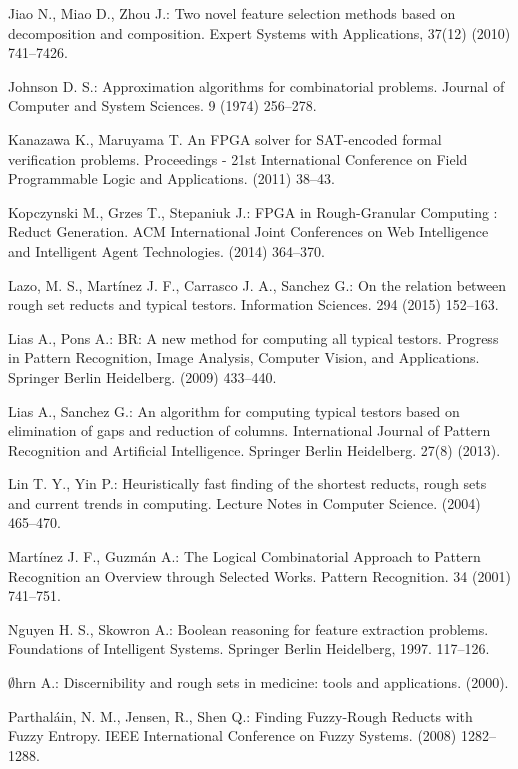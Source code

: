 \documentclass[11pt]{article}   %
\begin{document}
\begin{thebibliography}{}
	Jiao N., Miao D., Zhou J.:
 	Two novel feature selection methods based on decomposition and composition.
 	Expert Systems with Applications, 37(12) (2010) 741--7426.
 	
	Johnson D. S.:
	Approximation algorithms for combinatorial problems. 
	Journal of Computer and System Sciences. 9 (1974) 256--278.

	Kanazawa K., Maruyama T.
	An FPGA solver for SAT-encoded formal verification problems. 
	Proceedings - 21st International Conference on Field Programmable Logic and Applications. (2011) 38--43.

	Kopczynski M., Grzes T., Stepaniuk J.:
	FPGA in Rough-Granular Computing : Reduct Generation.
	ACM International Joint Conferences on Web Intelligence and Intelligent Agent Technologies. (2014) 364--370. 

	Lazo, M. S., Martínez J. F., Carrasco J. A., Sanchez G.:
	On the relation between rough set reducts and typical testors.
	Information Sciences. 294 (2015) 152--163.

	 Lias A., Pons A.:
	 BR: A new method for computing all typical testors.
	 Progress in Pattern Recognition, Image Analysis, Computer Vision, and Applications. 
	 Springer Berlin Heidelberg. (2009) 433--440.

	 Lias A., Sanchez G.:
	 An algorithm for computing typical testors based on elimination of gaps and reduction of columns.
	 International Journal of Pattern Recognition and Artificial Intelligence. 
	 Springer Berlin Heidelberg. 27(8) (2013).
	 
	 Lin T. Y., Yin P.:
	 Heuristically fast finding of the shortest reducts, rough sets and current trends in computing.
	 Lecture Notes in Computer Science. (2004) 465--470.
	
	Mart\'inez J. F., Guzm\'an A.:
	The Logical Combinatorial Approach to Pattern Recognition an Overview through Selected Works. 
	Pattern Recognition. 34 (2001) 741--751.

	Nguyen H. S., Skowron A.:
	Boolean reasoning for feature extraction problems.
	Foundations of Intelligent Systems. Springer Berlin Heidelberg, 1997. 117--126.	
	
	$\emptyset$hrn A.:
	Discernibility and rough sets in medicine: tools and applications. (2000).	
	 
	Parthaláin, N. M., Jensen, R., Shen Q.:
	Finding Fuzzy-Rough Reducts with Fuzzy Entropy.
	IEEE International Conference on Fuzzy Systems. (2008) 1282--1288.
	

\end{thebibliography}
\end{document}
